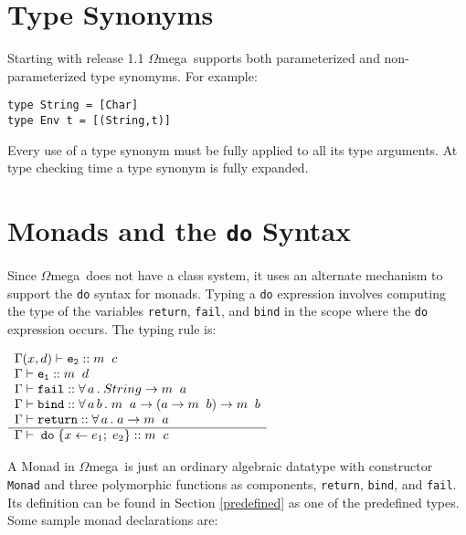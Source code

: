 \documentclass[11pt,twoside]{article}
\newcommand{\om}{$\Omega$mega}
\begin{document}
\section{Type Synonyms} \label{syn}
Starting with release 1.1 \om\ supports both parameterized 
and non-parameterized type synomyms.
For example:
\begin{verbatim}
type String = [Char]
type Env t = [(String,t)]
\end{verbatim}
Every use of a type synonym must be fully applied to all
its type arguments. At type checking time a type synonym
is fully expanded.

\section{Monads and the {\tt do} Syntax} \label{monads}
Since \om\ does not have a class system, it uses an alternate mechanism
to support the {\tt do} syntax for monads. Typing a {\tt do} expression
involves computing the type of the variables {\tt return}, {\tt fail},
and {\tt bind} in the scope where the {\tt do} expression occurs.
The typing rule is:
\vspace*{.1in}

$
\begin{array}{l}
 \Gamma(x,d) \vdash {\tt e_2} :: m\;\; c \\ 
 \Gamma \vdash {\tt e_1} :: m\;\; d \\ 
 \Gamma \vdash {\tt fail} ::  \forall\, a\, .\;String \rightarrow m\;\; a\\ 
 \Gamma \vdash {\tt bind} :: \forall\, a\, b\, .\; m\;\;a \rightarrow (a \rightarrow m\;\; b) \rightarrow m\;\; b\\ 
 \Gamma \vdash {\tt return} :: \forall\, a\, .\; a \rightarrow m\;\; a \\ \hline
 \Gamma \vdash \;{\tt do}\; \{ x  \leftarrow e_1; \; e_2 \} :: m\;\;c \
 \end{array}
$

\vspace*{.2in}
A Monad in \om\ is just an ordinary algebraic datatype with constructor {\tt
Monad} and three polymorphic functions as components, {\tt return}, {\tt bind},
and {\tt fail}. Its definition can be found in Section \ref{predefined} as one
of the predefined types. Some sample monad declarations are:
\end{document}
